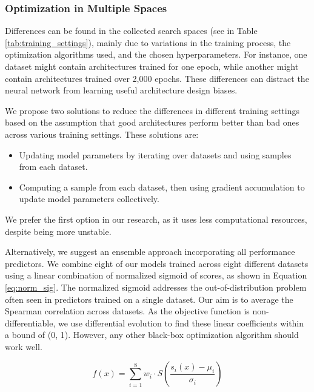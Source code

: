 \documentclass[lettersize,journal]{IEEEtran}
\begin{document}
        \subsubsection{Optimization in Multiple Spaces} \label{sec:mulspace}
             Differences can be found in the collected search spaces (see in Table \ref{tab:training_settings}), mainly due to variations in the training process, the optimization algorithms used, and the chosen hyperparameters. For instance, one dataset might contain architectures trained for one epoch, while another might contain architectures trained over 2,000 epochs. These differences can distract the neural network from learning useful architecture design biases.
            
            We propose two solutions to reduce the differences in different training settings based on the assumption that good architectures perform better than bad ones across various training settings. These solutions are:
            
            \begin{itemize}
            \item Updating model parameters by iterating over datasets and using samples from each dataset.
            \item Computing a sample from each dataset, then using gradient accumulation to update model parameters collectively.
            \end{itemize}
            
            We prefer the first option in our research, as it uses less computational resources, despite being more unstable.
            
            Alternatively, we suggest an ensemble approach incorporating all performance predictors. We combine eight of our models trained across eight different datasets using a linear combination of normalized sigmoid of scores, as shown in Equation \ref{eq:norm_sig}. The normalized sigmoid addresses the out-of-distribution problem often seen in predictors trained on a single dataset. Our aim is to average the Spearman correlation across datasets. As the objective function is non-differentiable, we use differential evolution to find these linear coefficients within a bound of (0, 1). However, any other black-box optimization algorithm should work well.
    
            \begin{equation} \label{eq:norm_sig}
            f(x) = \sum_{i=1}^{8} w_i \cdot S\left(\frac{s_i(x) - \mu_i}{\sigma_i}\right)
            \end{equation}
            
\end{document}
